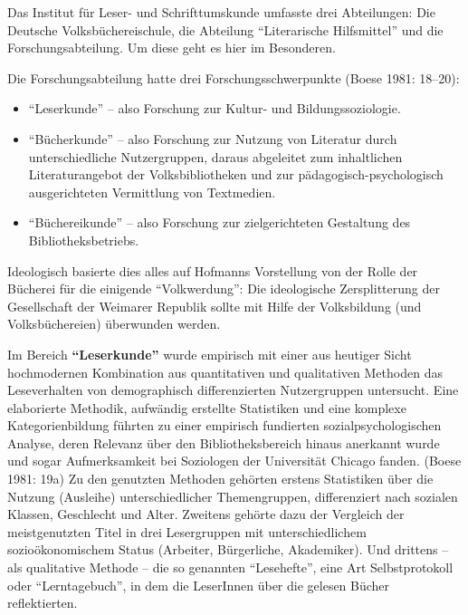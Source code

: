 \documentclass[a4paper,
fontsize=11pt,
oneside,
numbers=noperiodatend,
parskip=half-,
bibliography=totoc,
final
]{scrartcl}
\begin{document}
Das Institut für Leser- und Schrifttumskunde umfasste drei Abteilungen:
Die Deutsche Volksbüchereischule, die Abteilung \enquote{Literarische
Hilfsmittel} und die Forschungsabteilung. Um diese geht es hier im
Besonderen.

Die Forschungsabteilung hatte drei Forschungsschwerpunkte (Boese 1981:
18--20):

\begin{itemize}
\item
  \enquote{Leserkunde} -- also Forschung zur Kultur- und
  Bildungssoziologie.
\item
  \enquote{Bücherkunde} -- also Forschung zur Nutzung von Literatur
  durch unterschiedliche Nutzergruppen, daraus abgeleitet zum
  inhaltlichen Literaturangebot der Volksbibliotheken und zur
  pädagogisch-psychologisch ausgerichteten Vermittlung von Textmedien.
\item
  \enquote{Büchereikunde} -- also Forschung zur zielgerichteten
  Gestaltung des Bibliotheksbetriebs.
\end{itemize}

Ideologisch basierte dies alles auf Hofmanns Vorstellung von der Rolle
der Bücherei für die einigende \enquote{Volkwerdung}: Die ideologische
Zersplitterung der Gesellschaft der Weimarer Republik sollte mit Hilfe
der Volksbildung (und Volksbüchereien) überwunden werden.

Im Bereich \textbf{\enquote{Leserkunde}} wurde empirisch mit einer aus
heutiger Sicht hochmodernen Kombination aus quantitativen und
qualitativen Methoden das Leseverhalten von demographisch
differenzierten Nutzergruppen untersucht. Eine elaborierte Methodik,
aufwändig erstellte Statistiken und eine komplexe Kategorienbildung
führten zu einer empirisch fundierten sozialpsychologischen Analyse,
deren Relevanz über den Bibliotheksbereich hinaus anerkannt wurde und
sogar Aufmerksamkeit bei Soziologen der Universität Chicago fanden.
(Boese 1981: 19a) Zu den genutzten Methoden gehörten erstens Statistiken
über die Nutzung (Ausleihe) unterschiedlicher Themengruppen,
differenziert nach sozialen Klassen, Geschlecht und Alter. Zweitens
gehörte dazu der Vergleich der meistgenutzten Titel in drei Lesergruppen
mit unterschiedlichem sozioökonomischem Status (Arbeiter, Bürgerliche,
Akademiker). Und drittens -- als qualitative Methode -- die so genannten
\enquote{Lesehefte}, eine Art Selbstprotokoll oder
\enquote{Lerntagebuch}, in dem die LeserInnen über die gelesen Bücher
reflektierten.
\end{document}

